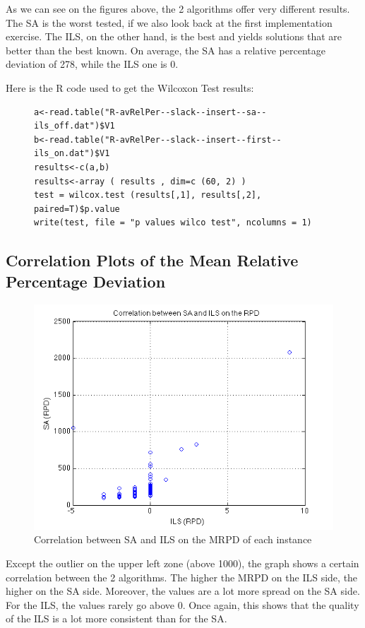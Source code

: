 As we can see on the figures above, the 2 algorithms offer very different results. The SA is the worst tested, if we also look back at the first implementation exercise. The ILS, on the other hand, is the best and yields solutions that are better than the best known. On average, the SA has a relative percentage deviation of 278, while the ILS one is 0.

Here is the R code used to get the Wilcoxon Test results:

\begin{figure}[H]
\begin{lstlisting}
a<-read.table("R-avRelPer--slack--insert--sa--ils_off.dat")$V1
b<-read.table("R-avRelPer--slack--insert--first--ils_on.dat")$V1
results<-c(a,b)
results<-array ( results , dim=c (60, 2) )
test = wilcox.test (results[,1], results[,2], paired=T)$p.value
write(test, file = "p values wilco test", ncolumns = 1)
\end{lstlisting}
\end{figure}

\subsection{Correlation Plots of the Mean Relative Percentage Deviation}

\begin{figure}[H]
\centering \includegraphics[width=\textwidth]{correlation.png}
\caption{Correlation between SA and ILS on the MRPD of each instance}
\end{figure}

Except the outlier on the upper left zone (above 1000), the graph shows a certain correlation between the 2 algorithms. The higher the MRPD on the ILS side, the higher on the SA side. Moreover, the values are a lot more spread on the SA side. For the ILS, the values rarely go above 0. Once again, this shows that the quality of the ILS is a lot more consistent than for the SA.



